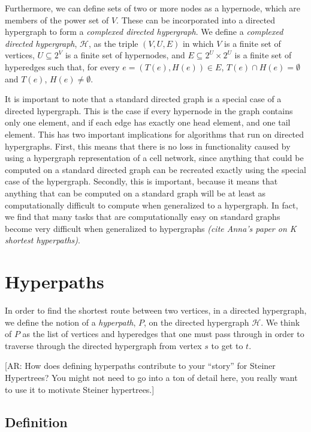 \documentclass[12pt,twoside]{reedthesis}
\newcommand{\anna}[1]{{\color{blue}[AR: #1]}}
\begin{document}
Furthermore, we can define sets of two or more nodes as a hypernode, which are members of the power set of $V$.  These can be incorporated into a directed hypergraph to form a \textit{complexed directed hypergraph}.  We define a \textit{complexed directed hypergraph}, $\mathcal{H}$, as the triple $(V,U,E)$ in which $V$ is a finite set of vertices, $U \subseteq 2^V$ is a finite set of hypernodes, and $E \subseteq 2^U \times 2^U$ is a finite set of hyperedges such that, for every $e=(T(e),H(e)) \in E$, $T(e) \cap H(e) = \emptyset$ and $T(e)$, $H(e) \neq \emptyset$.

It is important to note that a standard directed graph is a special case of a directed hypergraph.  This is the case if every hypernode in the graph contains only one element, and if each edge has exactly one head element, and one tail element.  This has two important implications for algorithms that run on directed hypergraphs.  First, this means that there is no loss in functionality caused by using a hypergraph representation of a cell network, since anything that could be computed on a standard directed graph can be recreated exactly using the special case of the hypergraph. Secondly, this is important, because it means that anything that can be computed on a standard graph will be at least as computationally difficult to compute when generalized to a hypergraph.  In fact, we find that many tasks that are computationally easy on standard graphs become very difficult when generalized to hypergraphs \textit{(cite Anna's paper on K shortest hyperpaths)}.

\section{Hyperpaths}
In order to find the shortest route between two vertices, in a directed hypergraph, we define the notion of a \textit{hyperpath}, $P$, on the directed hypergraph $\mathcal{H}$.  We think of $P$ as the list of vertices and hyperedges that one must pass through in order to traverse through the directed hypergraph from vertex $s$ to get to $t$.

\anna{How does defining hyperpaths contribute to your ``story'' for Steiner Hypertrees?  You might not need to go into a ton of detail here, you really want to use it to motivate Steiner hypertrees.}

\subsection{Definition}
\end{document}
